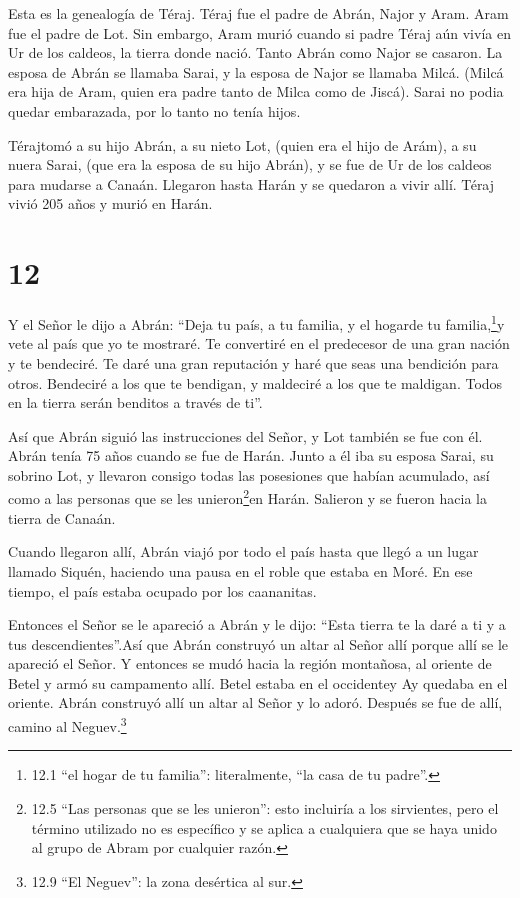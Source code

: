  Esta es la genealogía de Téraj. Téraj fue el padre de
Abrán, Najor y Aram. Aram fue el padre de Lot.  Sin
embargo, Aram murió cuando si padre Téraj aún vivía en Ur de los
caldeos, la tierra donde nació.  Tanto Abrán como Najor se
casaron. La esposa de Abrán se llamaba Sarai, y la esposa de Najor se
llamaba Milcá. (Milcá era hija de Aram, quien era padre tanto de Milca
como de Jiscá).  Sarai no podia quedar embarazada, por lo
tanto no tenía hijos.

 Térajtomó a su hijo Abrán, a su nieto Lot, (quien era el
hijo de Arám), a su nuera Sarai, (que era la esposa de su hijo Abrán), y
se fue de Ur de los caldeos para mudarse a Canaán. Llegaron hasta Harán
y se quedaron a vivir allí.  Téraj vivió 205 años y murió
en Harán.

\hypertarget{section-11}{%
\section{12}\label{section-11}}

 Y el Señor le dijo a Abrán: ``Deja tu país, a tu familia, y
el hogarde tu familia,\footnote{12.1 ``el hogar de tu familia'':
  literalmente, ``la casa de tu padre''.}y vete al país que yo te
mostraré.  Te convertiré en el predecesor de una gran nación
y te bendeciré. Te daré una gran reputación y haré que seas una
bendición para otros.  Bendeciré a los que te bendigan, y
maldeciré a los que te maldigan. Todos en la tierra serán benditos a
través de ti''.

 Así que Abrán siguió las instrucciones del Señor, y Lot
también se fue con él. Abrán tenía 75 años cuando se fue de Harán.
 Junto a él iba su esposa Sarai, su sobrino Lot, y llevaron
consigo todas las posesiones que habían acumulado, así como a las
personas que se les unieron\footnote{12.5 ``Las personas que se les
  unieron'': esto incluiría a los sirvientes, pero el término utilizado
  no es específico y se aplica a cualquiera que se haya unido al grupo
  de Abram por cualquier razón.}en Harán. Salieron y se fueron hacia la
tierra de Canaán.

Cuando llegaron allí,  Abrán viajó por todo el país hasta
que llegó a un lugar llamado Siquén, haciendo una pausa en el roble que
estaba en Moré. En ese tiempo, el país estaba ocupado por los
caananitas.

 Entonces el Señor se le apareció a Abrán y le dijo: ``Esta
tierra te la daré a ti y a tus descendientes''.Así que Abrán construyó
un altar al Señor allí porque allí se le apareció el Señor. 
Y entonces se mudó hacia la región montañosa, al oriente de Betel y armó
su campamento allí. Betel estaba en el occidentey Ay quedaba en el
oriente. Abrán construyó allí un altar al Señor y lo adoró. 
Después se fue de allí, camino al Neguev.\footnote{12.9 ``El Neguev'':
  la zona desértica al sur.}

